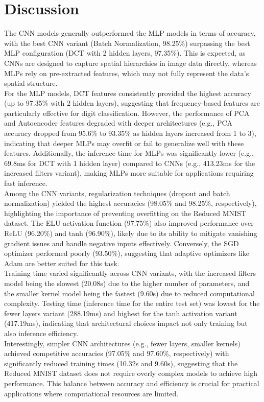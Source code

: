 \documentclass[a4paper,12pt]{article}
\begin{document}
\section{Discussion}
The CNN models generally outperformed the MLP models in terms of accuracy, with the best CNN variant (Batch Normalization, 98.25\%) surpassing the best MLP configuration (DCT with 2 hidden layers, 97.35\%). This is expected, as CNNs are designed to capture spatial hierarchies in image data directly, whereas MLPs rely on pre-extracted features, which may not fully represent the data's spatial structure.\\
For the MLP models, DCT features consistently provided the highest accuracy (up to 97.35\% with 2 hidden layers), suggesting that frequency-based features are particularly effective for digit classification. However, the performance of PCA and Autoencoder features degraded with deeper architectures (e.g., PCA accuracy dropped from 95.6\% to 93.35\% as hidden layers increased from 1 to 3), indicating that deeper MLPs may overfit or fail to generalize well with these features. Additionally, the inference time for MLPs was significantly lower (e.g., 69.8ms for DCT with 1 hidden layer) compared to CNNs (e.g., 413.23ms for the increased filters variant), making MLPs more suitable for applications requiring fast inference.\\
Among the CNN variants, regularization techniques (dropout and batch normalization) yielded the highest accuracies (98.05\% and 98.25\%, respectively), highlighting the importance of preventing overfitting on the Reduced MNIST dataset. The ELU activation function (97.75\%) also improved performance over ReLU (96.20\%) and tanh (96.90\%), likely due to its ability to mitigate vanishing gradient issues and handle negative inputs effectively. Conversely, the SGD optimizer performed poorly (93.50\%), suggesting that adaptive optimizers like Adam are better suited for this task.\\
Training time varied significantly across CNN variants, with the increased filters model being the slowest (20.08s) due to the higher number of parameters, and the smaller kernel model being the fastest (9.60s) due to reduced computational complexity. Testing time (inference time for the entire test set) was lowest for the fewer layers variant (288.19ms) and highest for the tanh activation variant (417.19ms), indicating that architectural choices impact not only training but also inference efficiency.\\
Interestingly, simpler CNN architectures (e.g., fewer layers, smaller kernels) achieved competitive accuracies (97.05\% and 97.60\%, respectively) with significantly reduced training times (10.32s and 9.60s), suggesting that the Reduced MNIST dataset does not require overly complex models to achieve high performance. This balance between accuracy and efficiency is crucial for practical applications where computational resources are limited.
\end{document}
